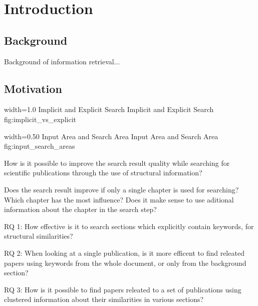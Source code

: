 \chapter{Introduction}
\label{cha:introduction}

\section{Background}
\label{sec:background}

Background of information retrieval...

\section{Motivation}
\label{sec:Motivation}

      {width=1.0\textwidth}
      {Implicit and Explicit Search}
      {Implicit and Explicit Search}
      {fig:implicit_vs_explicit}

      {width=0.50\textwidth}
      {Input Area and Search Area}
      {Input Area and Search Area}
      {fig:input_search_areas}

How is it possible to improve the search result quality while searching for scientific publications through the use of structural information?


Does the search result improve if only a single chapter is used for searching?
Which chapter has the most influence?
Does it make sense to use aditional information about the chapter in the search step?

RQ 1: How effective is it to search sections which explicitly contain keywords, for structural similarities?

RQ 2: When looking at a single publication, is it more efficent to find releated papers using keywords from the whole document, or only from the background section?

RQ 3: How is it possible to find papers releated to a set of publications using clustered information about their similarities in various sections?
